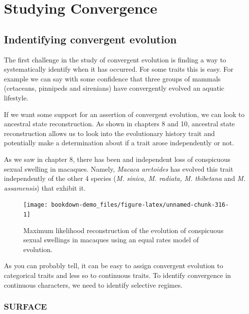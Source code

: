 \documentclass[
]{book}
\begin{document}
\hypertarget{convergence}{%
\chapter{Studying Convergence}\label{convergence}}

\hypertarget{indentifying-convergent-evolution}{%
\section{Indentifying convergent evolution}\label{indentifying-convergent-evolution}}

The first challenge in the study of convergent evolution is finding a way to systematically identify when it has occurred. For some traits this is easy. For example we can say with some confidence that three groups of mammals (cetaceans, pinnipeds and sirenians) have convergently evolved an aquatic lifestyle.

If we want some support for an assertion of convergent evolution, we can look to ancestral state reconstruction. As shown in chapters 8 and 10, ancestral state reconstruction allows us to look into the evolutionary history trait and potentially make a determination about if a trait arose independently or not.

As we saw in chapter 8, there has been and independent loss of conspicuous sexual swelling in macaques. Namely, \emph{Macaca arctoides} has evolved this trait independently of the other 4 species (\emph{M. sinica, M. radiata, M. thibetana} and \emph{M. assamensis}) that exhibit it.

\begin{figure}[H]

{\centering \texttt{[image: bookdown-demo\_files/figure-latex/unnamed-chunk-316-1]} 

}

\caption{Maximum likelihood reconstruction of the evolution of conspicuous sexual swellings in macaques using an equal rates model of evolution.}\label{fig:unnamed-chunk-316}
\end{figure}

As you can probably tell, it can be easy to assign convergent evolution to categorical traits and less so to continuous traits. To identify convergence in continuous characters, we need to identify selective regimes.

\hypertarget{surface}{%
\subsection{SURFACE}\label{surface}}
\end{document}
